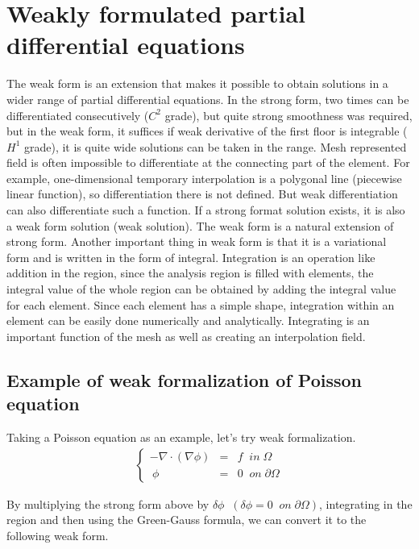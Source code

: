 \section{Weakly formulated partial differential equations}
%
The weak form is an extension that makes it possible to obtain solutions in a wider range of partial differential equations. 
%
In the strong form, two times can be differentiated consecutively ($C^2$ grade), but quite strong smoothness was required, but in the weak form, it suffices if weak derivative of the first floor is integrable ($H^1$ grade), it is quite wide solutions can be taken in the range. 
%
Mesh represented field is often impossible to differentiate at the connecting part of the element. For example, one-dimensional temporary interpolation is a polygonal line (piecewise linear function), so differentiation there is not defined. But weak differentiation can also differentiate such a function. If a strong format solution exists, it is also a weak form solution (weak solution). The weak form is a natural extension of strong form.
%
Another important thing in weak form is that it is a variational form and is written in the form of integral. 
%
Integration is an operation like addition in the region, since the analysis region is filled with elements, the integral value of the whole region can be obtained by adding the integral value for each element. Since each element has a simple shape, integration within an element can be easily done numerically and analytically. 
%
Integrating is an important function of the mesh as well as creating an interpolation field.


\subsection{Example of weak formalization of Poisson equation}
Taking a Poisson equation as an example, let's try weak formalization.
%
\begin{eqnarray}
\left\{\begin{array}{rll}
-\nabla\cdot( \nabla \phi) &=& f\;\;in\;\Omega\\\ 
\phi&=&0\;\;on\;\partial\Omega
\end{array}\right.
\end{eqnarray}

By multiplying the strong form above by $\delta\phi \;\; (\delta\phi=0\;\;on\;\partial\Omega)$, integrating in the region and then using the Green-Gauss formula, we can convert it to the following weak form.

